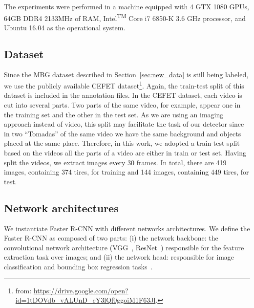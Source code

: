 The experiments were performed in a machine equipped with 4 GTX 1080 GPUs, 64GB DDR4 2133MHz of RAM, Intel\textsuperscript{TM} Core i7 6850-K 3.6 GHz processor, and Ubuntu 16.04 as the operational system.


\subsection{Dataset}
%
Since the MBG dataset described in Section~\ref{sec:new_data} is still being labeled, we use the publicly available CEFET dataset\footnote{from: \url{https://drive.google.com/open?id=1tDOVdb_vALUnD_cY3lQf0ggoiM1F63Jl}.}.
Again, the train-test split of this dataset is included in the annotation files.
In the CEFET dataset, each video is cut into several parts.
Two parts of the same video, for example, appear one in the training set and the other in the test set.
As we are using an imaging approach instead of video, this split may facilitate the task of our detector since in two ``Tomadas'' of the same video we have the same background and objects placed at the same place.
%
Therefore, in this work, we adopted a train-test split based on the videos \ie all the parts of a video are either in train or test set.
Having split the videos, we extract images every 30 frames.
In total, there are 419 images, containing 374 tires,  for training and 144 images, containing 449 tires,  for test.



%
\subsection{Network architectures}
We instantiate Faster R-CNN with different networks architectures.
We define the Faster R-CNN as composed of two parts:
(i) the network backbone: the convolutional network architecture (\eg VGG~\cite{Simonyan2015VGG}, ResNet~\cite{He2016deep}) responsible for the feature extraction task over images; and
(ii) the network head: responsible for image classification and bounding box regression tasks~\cite{He2017mask}.

